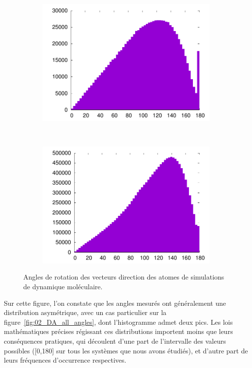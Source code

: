 \begin{figure}[htb]
\begin{subfigure}[t]{\subImgWaStats}
			\includegraphics[width=\textwidth]{figures/ch3/snare_tmd_gg_all_angles}
			\caption{}
			\label{fig:snare_tmd_gg_all_angles}
		\end{subfigure}
		~
		\begin{subfigure}[t]{\subImgWaStats}
			\centering
			\includegraphics[width=\textwidth]{figures/ch3/gk_extension_all_angles}
			\caption{}
			\label{fig:gk_extension_all_angles}
		\end{subfigure}
		\caption[Angles de rotation, dynamique moléculaire]{Angles de rotation des vecteurs direction des atomes de simulations de dynamique moléculaire.}
		\label{fig:dynMolAngles}
	\end{figure}	

	Sur cette figure, l'on constate que les angles mesurés ont généralement une distribution asymétrique, avec un cas particulier sur la figure~\ref{fig:02_DA_all_angles}, dont l'histogramme admet deux pics. Les lois mathématiques précises régissant ces distributions importent moins que leurs conséquences pratiques, qui découlent d'une part de l'intervalle des valeurs possibles ([0,180] sur tous les systèmes que nous avons étudiés), et d'autre part de leurs fréquences d'occurrence respectives.
	

